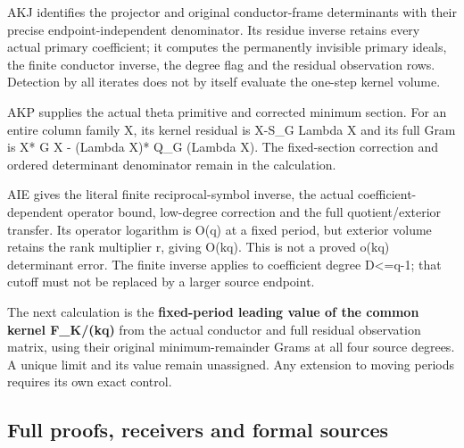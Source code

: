 \documentclass[
]{article}
\begin{document}
AKJ identifies the projector and original conductor-frame determinants
with their precise endpoint-independent denominator. Its residue inverse
retains every actual primary coefficient; it computes the permanently
invisible primary ideals, the finite conductor inverse, the degree flag
and the residual observation rows. Detection by all iterates does not by
itself evaluate the one-step kernel volume.

AKP supplies the actual theta primitive and corrected minimum section.
For an entire column family X, its kernel residual is X-S\_G Lambda X
and its full Gram is X* G X - (Lambda X)* Q\_G (Lambda X). The
fixed-section correction and ordered determinant denominator remain in
the calculation.

AIE gives the literal finite reciprocal-symbol inverse, the actual
coefficient-dependent operator bound, low-degree correction and the full
quotient/exterior transfer. Its operator logarithm is O(q) at a fixed
period, but exterior volume retains the rank multiplier r, giving O(kq).
This is not a proved o(kq) determinant error. The finite inverse applies
to coefficient degree D\textless=q-1; that cutoff must not be replaced
by a larger source endpoint.

The next calculation is the \textbf{fixed-period leading value of the
common kernel F\_K/(kq)} from the actual conductor and full residual
observation matrix, using their original minimum-remainder Grams at all
four source degrees. A unique limit and its value remain unassigned. Any
extension to moving periods requires its own exact control.

\subsection{Full proofs, receivers and formal
sources}\label{full-proofs-receivers-and-formal-sources}
\end{document}

